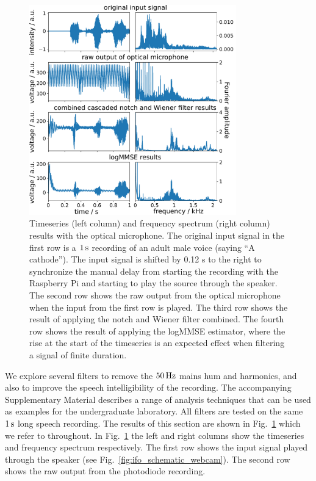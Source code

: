 \documentclass[paper-main.tex]{subfiles}
\begin{document}
\begin{figure}
\begin{center}
\includegraphics[width=0.8\textwidth]{figures/combined_highlight_results_melatos_labelled.pdf}
\caption{\label{fig:notchWienerLogMMSEResults}
Timeseries (left column) and frequency spectrum (right column) results with the optical microphone. 
The original input signal in the first row is a $1\,{\rm s}$ recording of an adult male voice (saying ``A cathode''). 
 The input signal is shifted by 0.12 s to the right to synchronize the manual delay from starting the recording with the Raspberry Pi and starting to play the source through the speaker. 
The second row shows the raw output from the optical microphone when the input from the first row is played. 
The third row shows the result of applying the notch and Wiener filter combined. 
The fourth row shows the result of applying the logMMSE estimator, where the rise at the start of the timeseries is an expected effect when filtering a signal of finite duration. 
}
\end{center}
\end{figure}

We explore several filters to remove the $50\,{\rm Hz}$ mains hum and harmonics, and also to improve the speech intelligibility of the recording.
The accompanying Supplementary Material describes a range of analysis techniques that can be used as examples for the undergraduate laboratory. 
All filters are tested on the same $1\,{\rm s}$ long speech recording.
The results of this section are shown in Fig.~\ref{fig:notchWienerLogMMSEResults} which we refer to throughout. 
In Fig.~\ref{fig:notchWienerLogMMSEResults} the left and right columns show the timeseries and frequency spectrum respectively. 
The first row shows the input signal played through the speaker (see Fig.~\ref{fig:ifo_schematic_webcam}). 
The second row shows the raw output from the photodiode recording. 
\end{document}

